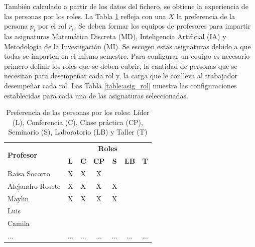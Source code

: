 También calculado a partir de los datos del fichero, se obtiene la experiencia de las personas por los roles.  La Tabla \ref{table:pref-pers-roles-doc} refleja con una $X$ la preferencia de la persona $p_i$ por el rol $r_i$. Se deben formar los equipos de profesores para impartir las asignaturas Matemática Discreta (MD), Inteligencia Artificial (IA) y Metodología de la Investigación (MI). Se escogen estas asignaturas debido a que todas se imparten en el mismo semestre.  Para configurar un equipo es necesario primero definir los roles que se deben cubrir, la cantidad de personas que se necesitan para desempeñar cada rol y, la carga que le conlleva al trabajador desempeñar cada rol. Las Tabla \ref{table:asig_rol} muestra las configuraciones establecidas para cada una de las asignaturas seleccionadas.


\begin{table}[H]
	\centering
	\caption{Preferencia de las personas por los roles: Líder (L), Conferencia (C), Clase práctica (CP), Seminario (S), Laboratorio (LB) y Taller (T)}\label{table:pref-pers-roles-doc}
	\begin{tabular}{l c c c c c c }
		\toprule
		\multirow{2}{2.5cm}{\textbf{Profesor}} &                                              \multicolumn{6}{c}{\textbf{Roles}}                                               \\ \cline{2-7}
		& \textbf{L} & \textbf{C} & \textbf{CP} & \textbf{S} & \textbf{LB} & \textbf{T} \\ \midrule
		Raisa Socorro                          & X              & X                    & X                       &                    &  \\ \hline
		Alejandro Rosete                       & X              & X                    & X                       & X                  &  \\ \hline
		Maylin                                 & X              & X                    & X                       & X                  &  \\ \hline
		Luis                                   &                &                      &                         &                    &  \\ \hline
		Camila                                 &                &                      &                         &                    &  \\ \hline
		...                                    & ...            & ...                  & ...                     & ...                & ...                  & ...             \\ \bottomrule
	\end{tabular}
\end{table}


